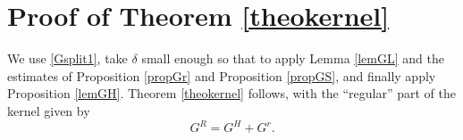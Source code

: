 \documentclass[11pt]{amsart}
\numberwithin{equation}{section}
\begin{document}
         
%        
%     
 
 \section{Proof of Theorem \ref{theokernel}}
We use \eqref{Gsplit1},  take $\delta$ small enough  
so that to apply Lemma \ref{lemGL} and the estimates of Proposition \ref{propGr} and Proposition \ref{propGS}, and finally  apply Proposition \ref{lemGH}.
Theorem \ref{theokernel} follows, with the ``regular'' part of the kernel given by
  $$ G^{R}= G^H + G^r.$$
  
\end{document}
